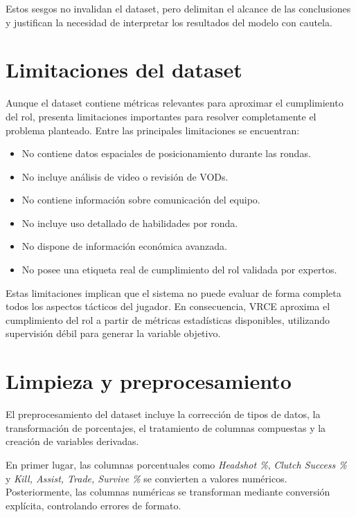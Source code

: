 \documentclass{ULBreport} %
\begin{document}
Estos sesgos no invalidan el dataset, pero delimitan el alcance de las conclusiones y justifican la necesidad de interpretar los resultados del modelo con cautela.

\section{Limitaciones del dataset}

Aunque el dataset contiene métricas relevantes para aproximar el cumplimiento del rol, presenta limitaciones importantes para resolver completamente el problema planteado. Entre las principales limitaciones se encuentran:

\begin{itemize}
    \item No contiene datos espaciales de posicionamiento durante las rondas.
    \item No incluye análisis de video o revisión de VODs.
    \item No contiene información sobre comunicación del equipo.
    \item No incluye uso detallado de habilidades por ronda.
    \item No dispone de información económica avanzada.
    \item No posee una etiqueta real de cumplimiento del rol validada por expertos.
\end{itemize}

Estas limitaciones implican que el sistema no puede evaluar de forma completa todos los aspectos tácticos del jugador. En consecuencia, VRCE aproxima el cumplimiento del rol a partir de métricas estadísticas disponibles, utilizando supervisión débil para generar la variable objetivo.

\section{Limpieza y preprocesamiento}

El preprocesamiento del dataset incluye la corrección de tipos de datos, la transformación de porcentajes, el tratamiento de columnas compuestas y la creación de variables derivadas.

En primer lugar, las columnas porcentuales como \textit{Headshot \%}, \textit{Clutch Success \%} y \textit{Kill, Assist, Trade, Survive \%} se convierten a valores numéricos. Posteriormente, las columnas numéricas se transforman mediante conversión explícita, controlando errores de formato.
\end{document}
